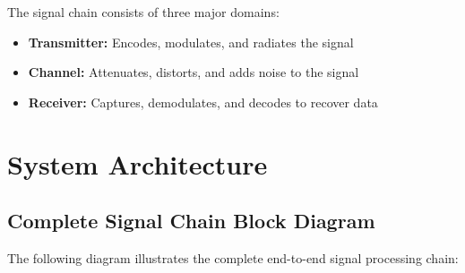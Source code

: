 The signal chain consists of three major domains:
\begin{itemize}
\item \textbf{Transmitter:} Encodes, modulates, and radiates the signal
\item \textbf{Channel:} Attenuates, distorts, and adds noise to the signal
\item \textbf{Receiver:} Captures, demodulates, and decodes to recover data
\end{itemize}

\section{System Architecture}

\subsection{Complete Signal Chain Block Diagram}

The following diagram illustrates the complete end-to-end signal processing chain:

